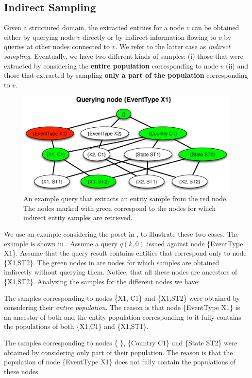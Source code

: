 \subsection{Indirect Sampling}
\label{sec:indirectsampling}
Given a structured domain, the extracted entities for a node $v$ can be obtained either by querying node $v$ directly or by indirect information flowing to $v$ by queries at other nodes connected to $v$. We refer to the latter case as {\em indirect sampling}. Eventually, we have two different kinds of samples: (i) those that were extracted by considering the {\bf entire population} corresponding to node $v$ (ii) and those that extracted by sampling {\bf only a part of the population} corresponding to $v$. 
\begin{figure}
	\begin{center}
	\includegraphics[clip,scale=0.3]{figs/exampleQuery.eps}	
	\caption{An example query that extracts an entity sample from the red node. The nodes marked with green correspond to the nodes for which indirect entity samples are retrieved.}
	\label{fig:query}
	\vspace{-20pt}
	\end{center}
\end{figure}
We use an example considering the poset in , to illustrate these two cases. The example is shown in . Assume a query $q(k,0)$ issued against node \{EventType X1\}. Assume that the query result contains entities that correspond only to node \{X1,ST2\}. The green nodes in  are nodes for which samples are obtained indirectly without querying them. Notice, that all these nodes are ancestors of \{X1,ST2\}. Analyzing the samples for the different nodes we have:
\squishlist
\item The samples corresponding to nodes \{X1, C1\} and \{X1,ST2\} were obtained by considering their {\em entire population}. The reason is that node \{EventType X1\} is an ancestor of both and the entity population corresponding to it fully contains the populations of both \{X1,C1\} and \{X1,ST1\}. 
\item The samples corresponding to nodes \{ \}, \{Country C1\} and \{State ST2\} were obtained by considering only part of their population. The reason is that the population of node \{EventType X1\} does not fully contain the populations of these nodes. 
\squishend

